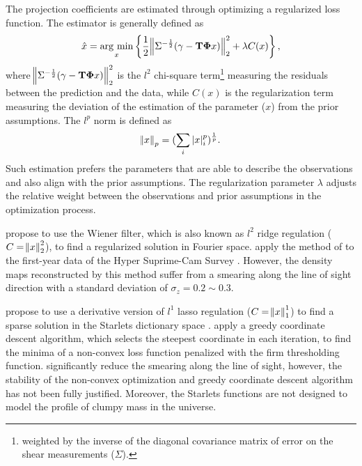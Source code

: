 \documentclass[twocolumn]{aastex62}
\newcommand{\argmin}{\mathop{\rm arg~min}\limits}
\begin{document}
The projection coefficients are estimated through optimizing a regularized loss function. The estimator is
generally defined as
\begin{equation}
\hat{x}=\argmin_{x} \left\{ \frac{1}{2}\norm{\Sigma^{-\frac{1}{2}}(\gamma- \mathbf{T\Phi} x)}_2^2+ \lambda C(x) \right\},
\end{equation}
where $\norm{\Sigma^{-\frac{1}{2}}(\gamma - \mathbf{T\Phi} x)}_2^2$ is the $l^2$ chi-square term\footnote{weighted by
the inverse of the diagonal covariance matrix of error on the shear measurements ($\Sigma$).} measuring
the residuals between the prediction and the data, while $C(x)$ is the regularization term measuring the deviation of
the estimation of the parameter ($x$) from the prior assumptions. The $l^p$ norm is defined as
\begin{equation}
\norm{x}_p=(\sum_{i} |x|^p_i)^{\frac{1}{p}}.
\end{equation}
Such estimation prefers the parameters that are able to describe the observations and also align with the prior assumptions.
The regularization parameter $\lambda$ adjusts the relative weight between the observations and prior assumptions in the
optimization process.

\citet{LSS-massMap-Wiener-Simon2009} propose to use the Wiener filter, which is also known as $l^2$ ridge regulation
($C=\norm{x}^2_2$), to find a regularized solution in Fourier space. \citet{HSC1-massMaps} apply the method of
\citet{LSS-massMap-Wiener-Simon2009} to the first-year data of the Hyper Suprime-Cam Survey \citep{HSC1-data}.
However, the density maps reconstructed by this method suffer from a smearing along the line of sight direction with
a standard deviation of $\sigma_z=0.2 \sim 0.3$.

\citet{LSS-massMap-Glimpse3D-Leonard2014} propose to use a derivative version of $l^1$ lasso regulation ($C=\norm{x}^1_1$)
to find a sparse solution in the Starlets dictionary space \citep{Starlet-Starck2015}. \citet{LSS-massMap-Glimpse3D-Leonard2014}
apply a greedy coordinate descent algorithm, which selects the steepest coordinate in each iteration, to find the minima
of a non-convex loss function penalized with the firm thresholding function. \citet{LSS-massMap-Glimpse3D-Leonard2014}
significantly reduce the smearing along the line of sight, however, the stability of the non-convex optimization and
greedy coordinate descent algorithm has not been fully justified. Moreover, the Starlets functions are not designed to
model the profile of clumpy mass in the universe.
\end{document}
